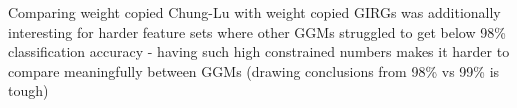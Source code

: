 Comparing weight copied Chung-Lu with weight copied GIRGs was additionally interesting for harder feature sets where other GGMs struggled to get below 98\% classification accuracy - having such high constrained numbers makes it harder to compare meaningfully between GGMs (drawing conclusions from 98\% vs 99\% is tough)




